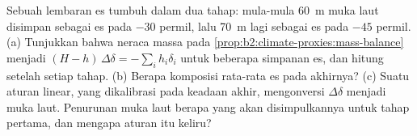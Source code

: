 \begin{exercise}[$\star\star\star$]\label{exo:b2:climate-proxies:12}
Sebuah lembaran es tumbuh dalam dua tahap: mula-mula \qty{60}{m} muka laut disimpan sebagai es pada $-30$ permil,
lalu \qty{70}{m} lagi sebagai es pada $-45$ permil. (a) Tunjukkan bahwa neraca massa pada
\cref{prop:b2:climate-proxies:mass-balance} menjadi $(H - h)\,\Delta\delta = -\sum_i h_i\delta_i$
untuk beberapa simpanan es, dan hitung  setelah setiap tahap. (b) Berapa komposisi
rata-rata es pada akhirnya? (c) Suatu aturan linear, yang dikalibrasi pada keadaan akhir, mengonversi
$\Delta\delta$ menjadi muka laut. Penurunan muka laut berapa yang akan disimpulkannya untuk tahap pertama, dan mengapa
aturan itu keliru?
\end{exercise}

